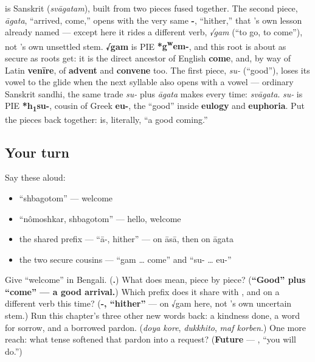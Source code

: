 \begin{cousinweb}
\textbf{} is Sanskrit \textbf{} (\emph{svāgatam}), built from two pieces fused together. The second piece, \emph{āgata}, \textquotedblleft{}arrived, come,\textquotedblright{} opens with the very same \textbf{-}, \textquotedblleft{}hither,\textquotedblright{} that 's own lesson already named — except here it rides a different verb, \emph{√gam} (\textquotedblleft{}to go, to come\textquotedblright{}), not 's own unsettled stem. \textbf{√gam} is PIE \textbf{*g\textsuperscript{w}em-}, and this root is about as secure as roots get: it is the direct ancestor of English \textbf{come}, and, by way of Latin \textbf{venīre}, of \textbf{advent} and \textbf{convene} too. The first piece, \emph{su-} (\textquotedblleft{}good\textquotedblright{}), loses its vowel to the glide \textbf{} when the next syllable also opens with a vowel — ordinary Sanskrit sandhi, the same trade \emph{su-} plus \emph{āgata} makes every time: \emph{svāgata}. \emph{su-} is PIE \textbf{*h\textsubscript{1}su-}, cousin of Greek \textbf{eu-}, the \textquotedblleft{}good\textquotedblright{} inside \textbf{eulogy} and \textbf{euphoria}. Put the pieces back together:  is, literally, \textquotedblleft{}a good coming.\textquotedblright{}
\end{cousinweb}

\subsection*{Your turn}
Say these aloud:

\begin{itemize}
\raggedright
  \item \textquotedblleft{}shbagotom\textquotedblright{} — welcome
  \item \textquotedblleft{}nômoshkar, shbagotom\textquotedblright{} — hello, welcome
  \item the shared prefix — \textquotedblleft{}ā-, hither\textquotedblright{} — on āsā, then on āgata
  \item the two secure cousins — \textquotedblleft{}gam … come\textquotedblright{} and \textquotedblleft{}su- … eu-\textquotedblright{}
\end{itemize}

\begin{tcolorbox}[breakable,colback=teal!4,colframe=teal!35!black,title={Before you move on}]
Give \textquotedblleft{}welcome\textquotedblright{} in Bengali. (\textbf{.}) What does  mean, piece by piece? (\textbf{\textquotedblleft{}Good\textquotedblright{} plus \textquotedblleft{}come\textquotedblright{} — a good arrival.}) Which prefix does it share with , and on a different verb this time? (\textbf{-, \textquotedblleft{}hither\textquotedblright{}} — on √gam here, not 's own uncertain stem.) Run this chapter's three other new words back: a kindness done, a word for sorrow, and a borrowed pardon. (\emph{doya kore}, \emph{dukkhito}, \emph{maf korben}.) One more reach: what tense softened that pardon into a request? (\textbf{Future} — , \textquotedblleft{}you will do.\textquotedblright{})
\end{tcolorbox}
